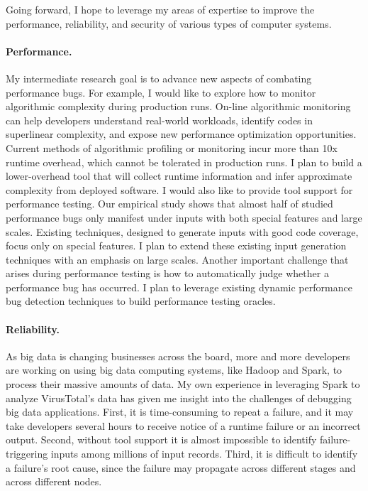 \documentclass[10pt]{article}
\begin{document}
Going forward, I hope to leverage my areas of expertise to improve the performance, 
reliability, and security of various types of computer systems. 

\vspace{-.1in}
\paragraph{Performance.} 
My intermediate research goal is to advance new aspects of combating performance bugs.
For example, I would like to explore how to monitor algorithmic complexity during production runs. 
On-line algorithmic monitoring can help developers understand real-world workloads, 
identify codes in superlinear complexity, 
and expose new performance optimization opportunities. 
Current methods of algorithmic profiling or monitoring incur more than 10x runtime overhead, which cannot be tolerated in production runs. 
I plan to build a lower-overhead tool that will collect runtime information 
and infer approximate complexity from deployed software. 
I would also like to provide tool support for performance testing.
Our empirical study shows that almost half of studied performance bugs only manifest 
under inputs with both special features and large scales.
Existing techniques, designed to generate inputs with good code coverage, focus only on special features.
I plan to extend these existing input generation techniques with an emphasis on large scales. 
Another important challenge that arises during performance testing is how to automatically judge whether a performance bug has occurred. 
I plan to leverage existing dynamic performance bug detection techniques to build performance testing oracles.

\vspace{-.1in}
\paragraph{Reliability.} 
As big data is changing businesses across the board, 
more and more developers are working on using big data computing systems, 
like Hadoop and Spark, to process their massive amounts of data. 
My own experience in leveraging Spark to analyze VirusTotal's data 
has given me insight into the challenges of debugging big data applications. 
First, it is time-consuming to repeat a failure, and it may take developers several hours to receive notice of a runtime failure or an incorrect output.
Second, without tool support it is almost impossible to identify failure-triggering inputs among millions of input records. 
Third, it is difficult to identify a failure's root cause, 
since the failure may propagate across different stages and across different nodes.
\end{document}
